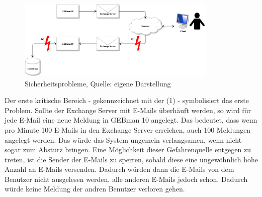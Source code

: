 \begin{figure}[h!]
\centering
\includegraphics[width=0.85\textwidth]{Abbildungen/Sicherheitsprobleme.png}
	\caption[Sicherheitsprobleme]{Sicherheitsprobleme, Quelle: eigene Darstellung}
	\label{fig:Sicherheitsprobleme}
\end{figure}

\noindent
Der erste kritische Bereich - gekennzeichnet mit der (1) - symbolisiert das erste Problem. Sollte der Exchange Server mit E-Mails überhäuft werden, so wird für jede E-Mail eine neue Meldung in GEBman 10 angelegt. Das bedeutet, dass wenn pro Minute 100 E-Mails in den Exchange Server erreichen, auch 100 Meldungen angelegt werden. Das würde das System ungemein verlangsamen, wenn nicht sogar zum Absturz bringen. Eine Möglichkeit dieser Gefahrenquelle entgegen zu treten, ist die Sender der E-Mails zu sperren, sobald diese eine ungewöhnlich hohe Anzahl an E-Mails versenden. Dadurch würden dann die E-Mails von dem Benutzer nicht ausgelesen werden, alle anderen E-Mails jedoch schon. Dadurch würde keine Meldung der andren Benutzer verloren gehen.\\

